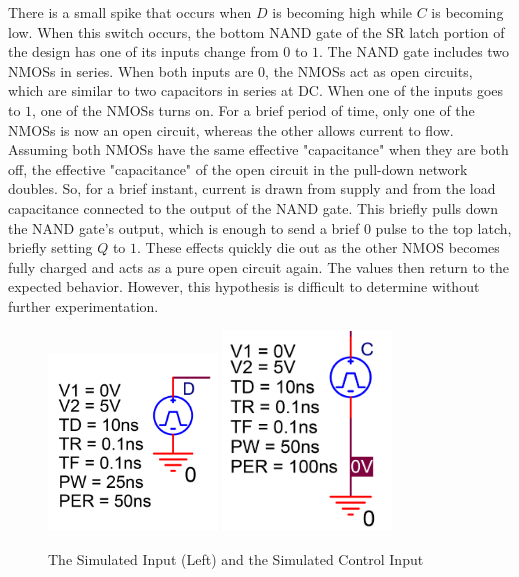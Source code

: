 There is a small spike that occurs when $D$ is becoming high while $C$ is becoming low.
When this switch occurs, the bottom NAND gate of the SR latch portion of the design has one of its inputs change from $0$ to $1$.
The NAND gate includes two NMOSs in series.
When both inputs are $0$, the NMOSs act as open circuits, which are similar to two capacitors in series at DC.
When one of the inputs goes to $1$, one of the NMOSs turns on.
For a brief period of time, only one of the NMOSs is now an open circuit, whereas the other allows current to flow.
Assuming both NMOSs have the same effective "capacitance" when they are both off, the effective "capacitance" of the open circuit in the pull-down network doubles.
So, for a brief instant, current is drawn from supply and from the load capacitance connected to the output of the NAND gate.
This briefly pulls down the NAND gate's output, which is enough to send a brief $0$ pulse to the top latch, briefly setting $Q$ to $1$.
These effects quickly die out as the other NMOS becomes fully charged and acts as a pure open circuit again.
The values then return to the expected behavior.
However, this hypothesis is difficult to determine without further experimentation.

\FloatBarrier

\begin{figure}[h!]
	\centering
	\includegraphics[width=0.4\textwidth]{./images/D_supply}
	\includegraphics[width=0.4\textwidth]{./images/C_supply}
	\caption{The Simulated Input (Left) and the Simulated Control Input}
	\label{fig:supplys}
\end{figure}

